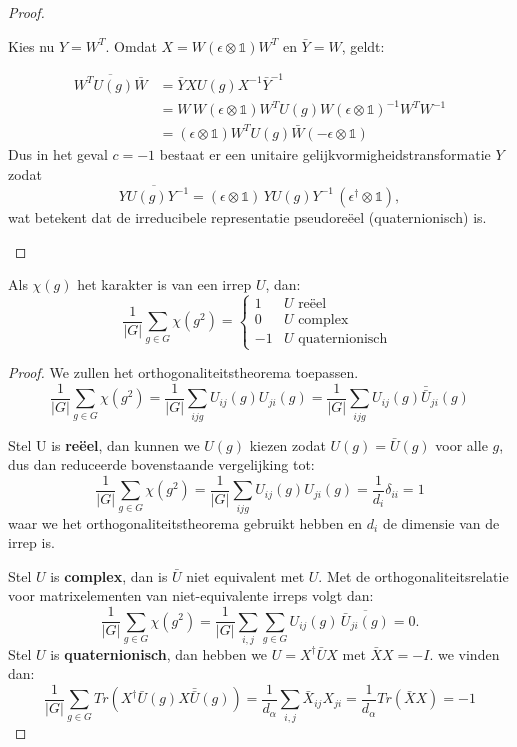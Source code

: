 \begin{proof}
\begin{itemize}
    Kies nu \(\boxed{Y = W^{T}}\). Omdat \(X = W(\epsilon\otimes\mathds{1})W^{T}\) en \(\bar{Y}=W\), geldt:

    \begin{align*}
        \overline{W^TU(g)\bar{W}}
        &= \bar{Y}XU(g)X^{-1}\bar{Y}^{-1} \\
        &= W\,W(\epsilon\otimes\mathds{1})W^{T}U(g)W(\epsilon\otimes\mathds{1})^{-1}W^{T}W^{-1}\\
        &= (\epsilon\otimes\mathds{1})W^TU(g)\bar{W}(-\epsilon \otimes\mathds{1})
    \end{align*}
    Dus in het geval \(c=-1\) bestaat er een unitaire gelijkvormigheidstransformatie \(Y\) zodat
    \[\overline{YU(g)Y^{-1}} = (\epsilon\otimes\mathds{1})\,YU(g)Y^{-1}\,(\epsilon^{\dagger}\otimes\mathds{1}),\]
    wat betekent dat de irreducibele representatie pseudoreëel (quaternionisch) is.
\end{itemize}
\end{proof}

\begin{theorem}
    Als \(\chi (g)\) het karakter is van een irrep \(U\), dan:
\[\frac{1}{|G|} \sum_{g \in G} \chi(g^2) = \begin{cases}
    1 &  U \text{ reëel } \\
    0 &  U \text{ complex} \\
    -1 & U \text{ quaternionisch }
\end{cases}\]
\end{theorem}
\begin{proof}
    We zullen het orthogonaliteitstheorema toepassen.
    \[
        \frac{1}{|G|} \sum_{g \in G} \chi(g^2) = \frac{1}{|G|} \sum_{ijg}U_{ij}(g)U_{ji}(g) = \frac{1}{|G|} \sum_{ijg}U_{ij}(g)\bar{\bar{U}}_{ji}(g)
    \]

    Stel U is \textbf{reëel}, dan kunnen we \(U(g)\) kiezen zodat \(U(g) = \bar{U}(g)\) voor alle \(g\), dus dan reduceerde bovenstaande vergelijking tot:
    \[
        \frac{1}{|G|} \sum_{g \in G} \chi(g^2) =  \frac{1}{|G|} \sum_{ijg}U_{ij}(g){U}_{ji}(g) = \frac{1}{d_i} \delta_{ii} = 1
    \]
    waar we het orthogonaliteitstheorema gebruikt hebben en \(d_i\) de dimensie van de irrep is.

    Stel \(U\) is \textbf{complex}, dan is \(\bar{U}\) niet equivalent met \(U\). Met de orthogonaliteitsrelatie voor matrixelementen van niet-equivalente irreps volgt dan:
    \[
            \frac{1}{|G|} \sum_{g \in G} \chi(g^2)
            = \frac{1}{|G|} \sum_{i,j}\sum_{g\in G} U_{ij}(g)\,\overline{\bar{U}_{ji}(g)}
            = 0.
    \]
    Stel \(U\) is \textbf{quaternionisch}, dan hebben we \(U = X^\dagger \bar{U}X  \) met \(\bar{X}X = - I\). we vinden dan:
    \[
    \frac{1}{|G|} \sum_{g \in G} Tr(X^\dagger \bar{U}(g) X \bar{\bar{U}}(g)) = \frac{1}{d_\alpha} \sum_{i,j}\bar{X}_{ij}X_{ji} = \frac{1}{d_\alpha}  Tr(\bar{X}X) = -1
    \]
\end{proof}

